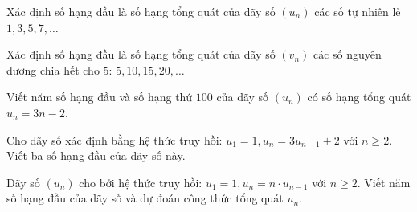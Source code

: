 \begin{vd}[NB]%
	Xác định số hạng đầu là số hạng tổng quát của dãy số $(u_n)$ các số tự nhiên lẻ $1, 3, 5, 7, \ldots $
\end{vd}

\begin{vd}[NB]%
	Xác định số hạng đầu là số hạng tổng quát của dãy số $(v_n)$ các số nguyên dương chia hết cho $5$: $5,10,15,20,\ldots$
\end{vd}

\begin{vd}[NB]%
	Viết năm số hạng đầu và số hạng thứ $100$ của dãy số $(u_n)$ có số hạng tổng quát $u_n=3n-2$.
\end{vd}

\begin{vd}[NB]%
	Cho dãy số xác định bằng hệ thức truy hồi: $u_1=1, u_n=3u_{n-1}+2$ với $n\ge 2$. Viết ba số hạng đầu của dãy số này.
\end{vd}

\begin{vd}[NB]%
	Dãy số $(u_n)$ cho bởi hệ thức truy hồi: $u_1=1, u_n=n \cdot u_{n-1}$ với $n \ge 2$. Viết năm số hạng đầu của dãy số và dự đoán công thức tổng quát $u_n$.
\end{vd}

